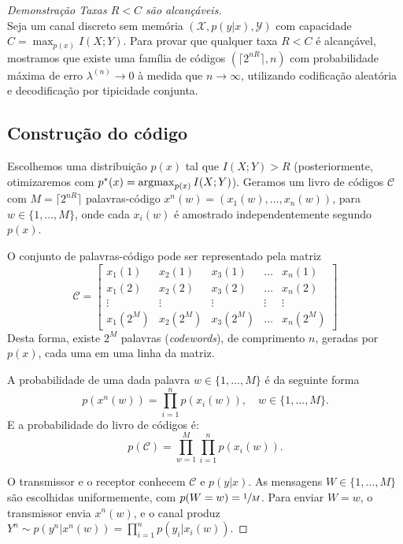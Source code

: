 \begin{proof}[Demonstração Taxas $R < C$ são alcançáveis] \ \\

Seja um canal discreto sem memória $(\mathcal{X}, p(y|x), \mathcal{Y})$ com capacidade 
$C = \max_{p(x)} I(X;Y)$. Para provar que qualquer taxa $R < C$ é alcançável,
mostramos que existe uma família de códigos $(\lceil 2^{nR} \rceil, n)$ com
probabilidade máxima de erro $\lambda^{(n)} \to 0$ à medida que $n \to \infty$,
utilizando codificação aleatória e decodificação por tipicidade conjunta.

\subsection*{Construção do código}

Escolhemos uma distribuição $p(x)$ tal que $I(X;Y) > R$ (posteriormente,
otimizaremos com $p^*(x) = \operatorname*{\arg\!\max}_{p(x)} I(X;Y)$). Geramos um livro de códigos
$\mathcal{C}$ com $M = \lceil 2^{nR} \rceil$ palavras-código 
$x^n(w) = (x_1(w), \ldots, x_n(w))$, para $w \in \{1, \ldots, M\}$, onde cada $x_i(w)$ é amostrado
independentemente segundo $p(x)$.

O conjunto de palavras-código pode ser representado pela matriz
	\begin{equation}
	\mathcal{C} = \begin{bmatrix}
		x_1(1) & x_2(1) & x_3(1) & \ldots & x_n(1) \\
		x_1(2) & x_2(2) & x_3(2) & \ldots & x_n(2) \\
		\vdots & \vdots & \vdots & \vdots & \vdots \\
		x_1(2^{M}) & x_2(2^{M}) & x_3(2^{M}) & \ldots & x_n(2^{M}) 
		\end{bmatrix}
	\end{equation}
	Desta forma, existe $2^{M}$ palavras (\textit{codewords}), de comprimento $n$, 
	geradas por $p(x)$, cada uma em uma linha da matriz.

A probabilidade de uma dada palavra $w \in \{1, \ldots, M\}$ é da seguinte forma
\begin{equation}
p\left( x^n(w) \right) = \prod_{i=1}^{n} p\left( x_i(w) \right) , \quad w \in \{1, \ldots, M\} .
\end{equation}
E a probabilidade do livro de códigos é:
\begin{equation}
p(\mathcal{C}) = \prod_{w=1}^M \prod_{i=1}^n p(x_i(w)).
\end{equation}

O transmissor e o receptor conhecem $\mathcal{C}$ e $p(y|x)$. 
As mensagens $W \in \{1, \ldots, M\}$ são escolhidas uniformemente, com $p(W=w) = \sfrac{1}{M}$. Para
enviar $W=w$, o transmissor envia $x^n(w)$, e o canal produz $Y^n \sim p(y^n | x^n(w)) = \prod_{i=1}^n p(y_i | x_i(w))$.


\end{proof}
